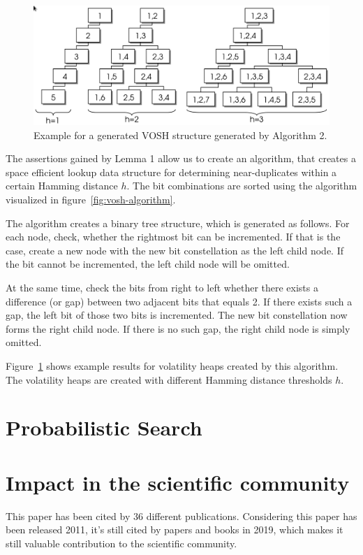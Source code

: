 \documentclass[12pt,a4paper,DIV=calc]{scrartcl}
\begin{document}
\begin{figure}[H]
\includegraphics[scale=0.4]{./gfx/vosh_structure.png}
\centering
\caption{Example for a generated VOSH structure generated by Algorithm 2.}\label{fig:vosh-structure}
\end{figure}


The assertions gained by Lemma 1 allow us to create an algorithm, that creates a space efficient lookup data structure for determining near-duplicates within a certain Hamming distance $h$.
The bit combinations are sorted using the algorithm visualized in figure~\ref{fig:vosh-algorithm}.

The algorithm creates a binary tree structure, which is generated as follows.
For each node, check, whether the rightmost bit can be incremented.
If that is the case, create a new node with the new bit constellation as the left child node.
If the bit cannot be incremented, the left child node will be omitted.

At the same time, check the bits from right to left whether there exists a difference (or gap) between two adjacent bits that equals 2.
If there exists such a gap, the left bit of those two bits is incremented.
The new bit constellation now forms the right child node.
If there is no such gap, the right child node is simply omitted.

Figure~\ref{fig:vosh-structure} shows example results for volatility heaps created by this algorithm.
The volatility heaps are created with different Hamming distance thresholds $h$.

\section{Probabilistic Search}



\section{Impact in the scientific community}
This paper has been cited by 36 different publications.
Considering this paper has been released 2011, it's still cited by papers and books in 2019, which makes it still valuable contribution to the scientific community.
\end{document}
